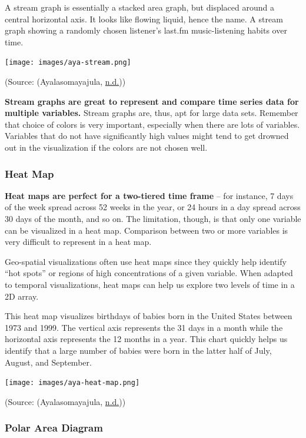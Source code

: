 \documentclass[]{book}
\begin{document}
A stream graph is essentially a stacked area graph, but displaced around a central horizontal axis. It looks like flowing liquid, hence the name. A stream graph showing a randomly chosen listener's last.fm music-listening habits over time.

\texttt{[image: images/aya-stream.png]}

(Source: (Ayalasomayajula, \protect\hyperlink{ref-aya-time-series}{n.d.}))

\textbf{Stream graphs are great to represent and compare time series data for multiple variables.} Stream graphs are, thus, apt for large data sets. Remember that choice of colors is very important, especially when there are lots of variables. Variables that do not have significantly high values might tend to get drowned out in the visualization if the colors are not chosen well.

\hypertarget{heat-map}{%
\subsubsection{Heat Map}\label{heat-map}}

\textbf{Heat maps are perfect for a two-tiered time frame} -- for instance, 7 days of the week spread across 52 weeks in the year, or 24 hours in a day spread across 30 days of the month, and so on. The limitation, though, is that only one variable can be visualized in a heat map. Comparison between two or more variables is very difficult to represent in a heat map.

Geo-spatial visualizations often use heat maps since they quickly help identify ``hot spots'' or regions of high concentrations of a given variable. When adapted to temporal visualizations, heat maps can help us explore two levels of time in a 2D array.

This heat map visualizes birthdays of babies born in the United States between 1973 and 1999. The vertical axis represents the 31 days in a month while the horizontal axis represents the 12 months in a year. This chart quickly helps us identify that a large number of babies were born in the latter half of July, August, and September.

\texttt{[image: images/aya-heat-map.png]}

(Source: (Ayalasomayajula, \protect\hyperlink{ref-aya-time-series}{n.d.}))

\hypertarget{polar-area-diagram}{%
\subsubsection{Polar Area Diagram}\label{polar-area-diagram}}
\end{document}
